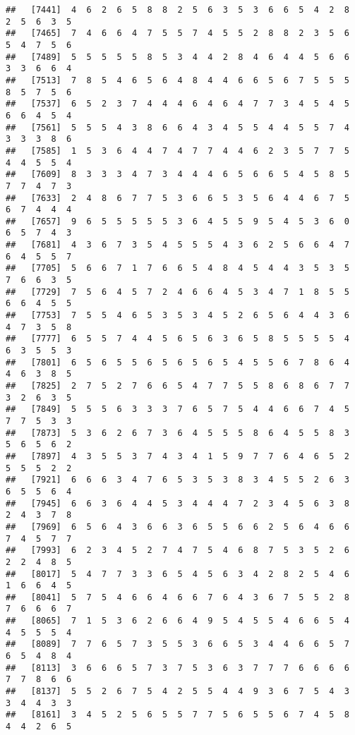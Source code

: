 \documentclass[
]{book}
\begin{document}
\begin{verbatim}
##   [7441]  4  6  2  6  5  8  8  2  5  6  3  5  3  6  6  5  4  2  8  2  5  6  3  5
##   [7465]  7  4  6  6  4  7  5  5  7  4  5  5  2  8  8  2  3  5  6  5  4  7  5  6
##   [7489]  5  5  5  5  5  8  5  3  4  4  2  8  4  6  4  4  5  6  6  3  3  6  6  4
##   [7513]  7  8  5  4  6  5  6  4  8  4  4  6  6  5  6  7  5  5  5  8  5  7  5  6
##   [7537]  6  5  2  3  7  4  4  4  6  4  6  4  7  7  3  4  5  4  5  6  6  4  5  4
##   [7561]  5  5  5  4  3  8  6  6  4  3  4  5  5  4  4  5  5  7  4  3  3  3  8  6
##   [7585]  1  5  3  6  4  4  7  4  7  7  4  4  6  2  3  5  7  7  5  4  4  5  5  4
##   [7609]  8  3  3  3  4  7  3  4  4  4  6  5  6  6  5  4  5  8  5  7  7  4  7  3
##   [7633]  2  4  8  6  7  7  5  3  6  6  5  3  5  6  4  4  6  7  5  6  7  4  4  4
##   [7657]  9  6  5  5  5  5  5  3  6  4  5  5  9  5  4  5  3  6  0  6  5  7  4  3
##   [7681]  4  3  6  7  3  5  4  5  5  5  4  3  6  2  5  6  6  4  7  6  4  5  5  7
##   [7705]  5  6  6  7  1  7  6  6  5  4  8  4  5  4  4  3  5  3  5  7  6  6  3  5
##   [7729]  7  5  6  4  5  7  2  4  6  6  4  5  3  4  7  1  8  5  5  6  6  4  5  5
##   [7753]  7  5  5  4  6  5  3  5  3  4  5  2  6  5  6  4  4  3  6  4  7  3  5  8
##   [7777]  6  5  5  7  4  4  5  6  5  6  3  6  5  8  5  5  5  5  4  6  3  5  5  3
##   [7801]  6  5  6  5  5  6  5  6  5  6  5  4  5  5  6  7  8  6  4  4  6  3  8  5
##   [7825]  2  7  5  2  7  6  6  5  4  7  7  5  5  8  6  8  6  7  7  3  2  6  3  5
##   [7849]  5  5  5  6  3  3  3  7  6  5  7  5  4  4  6  6  7  4  5  7  7  5  3  3
##   [7873]  5  3  6  2  6  7  3  6  4  5  5  5  8  6  4  5  5  8  3  5  6  5  6  2
##   [7897]  4  3  5  5  3  7  4  3  4  1  5  9  7  7  6  4  6  5  2  5  5  5  2  2
##   [7921]  6  6  6  3  4  7  6  5  3  5  3  8  3  4  5  5  2  6  3  6  5  5  6  4
##   [7945]  6  6  3  6  4  4  5  3  4  4  4  7  2  3  4  5  6  3  8  2  4  3  7  8
##   [7969]  6  5  6  4  3  6  6  3  6  5  5  6  6  2  5  6  4  6  6  7  4  5  7  7
##   [7993]  6  2  3  4  5  2  7  4  7  5  4  6  8  7  5  3  5  2  6  2  2  4  8  5
##   [8017]  5  4  7  7  3  3  6  5  4  5  6  3  4  2  8  2  5  4  6  1  6  6  4  5
##   [8041]  5  7  5  4  6  6  4  6  6  7  6  4  3  6  7  5  5  2  8  7  6  6  6  7
##   [8065]  7  1  5  3  6  2  6  6  4  9  5  4  5  5  4  6  6  5  4  4  5  5  5  4
##   [8089]  7  7  6  5  7  3  5  5  3  6  6  5  3  4  4  6  6  5  7  6  5  4  8  4
##   [8113]  3  6  6  6  5  7  3  7  5  3  6  3  7  7  7  6  6  6  6  7  7  8  6  6
##   [8137]  5  5  2  6  7  5  4  2  5  5  4  4  9  3  6  7  5  4  3  3  4  4  3  3
##   [8161]  3  4  5  2  5  6  5  5  7  7  5  6  5  5  6  7  4  5  8  4  4  2  6  5

\end{verbatim}
\end{document}
